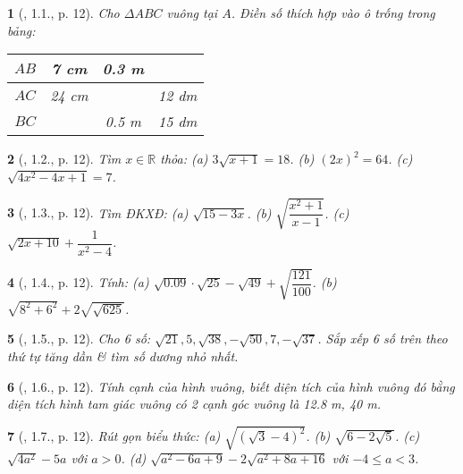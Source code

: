 \documentclass{article}
\newtheorem{baitoan}{}%
\begin{document}
\begin{baitoan}[\cite{Binh_boi_duong_Toan_9_tap_1}, 1.1., p. 12]
	Cho $\Delta ABC$ vuông tại $A$. Điền số thích hợp vào ô trống trong bảng:
	\begin{table}[H]
		\centering
		\begin{tabular}{|c|c|c|c|}
			\hline
			$AB$ & 7 cm & 0.3 m &  \\
			\hline
			$AC$ & 24 cm &  & 12 dm \\
			\hline
			$BC$ &  & 0.5 m & 15 dm \\
			\hline
		\end{tabular}
	\end{table}
\end{baitoan}

\begin{baitoan}[\cite{Binh_boi_duong_Toan_9_tap_1}, 1.2., p. 12]
	Tìm $x\in\mathbb{R}$ thỏa: (a) $3\sqrt{x + 1} = 18$. (b) $(2x)^2 = 64$. (c) $\sqrt{4x^2 - 4x + 1} = 7$.
\end{baitoan}

\begin{baitoan}[\cite{Binh_boi_duong_Toan_9_tap_1}, 1.3., p. 12]
	Tìm {\rm ĐKXĐ}: (a) $\sqrt{15 - 3x}$. (b) $\sqrt{\dfrac{x^2 + 1}{x - 1}}$. (c) $\sqrt{2x + 10} + \dfrac{1}{x^2 - 4}$.
\end{baitoan}

\begin{baitoan}[\cite{Binh_boi_duong_Toan_9_tap_1}, 1.4., p. 12]
	Tính: (a) $\sqrt{0.09}\cdot\sqrt{25} - \sqrt{49} + \sqrt{\dfrac{121}{100}}$. (b) $\sqrt{8^2 + 6^2} + 2\sqrt{\sqrt{625}}$.
\end{baitoan}

\begin{baitoan}[\cite{Binh_boi_duong_Toan_9_tap_1}, 1.5., p. 12]
	Cho 6 số: $\sqrt{21},5,\sqrt{38},-\sqrt{50},7,-\sqrt{37}$. Sắp xếp 6 số trên theo thứ tự tăng dần \& tìm số dương nhỏ nhất.
\end{baitoan}

\begin{baitoan}[\cite{Binh_boi_duong_Toan_9_tap_1}, 1.6., p. 12]
	Tính cạnh của hình vuông, biết diện tích của hình vuông đó bằng diện tích hình tam giác vuông có 2 cạnh góc vuông là {\rm12.8 m, 40 m}.
\end{baitoan}

\begin{baitoan}[\cite{Binh_boi_duong_Toan_9_tap_1}, 1.7., p. 12]
	Rút gọn biểu thức: (a) $\sqrt{(\sqrt{3} - 4)^2}$. (b) $\sqrt{6 - 2\sqrt{5}}$. (c) $\sqrt{4a^2} - 5a$ với $a > 0$. (d) $\sqrt{a^2 - 6a + 9} - 2\sqrt{a^2 + 8a + 16}$ với $-4\le a < 3$.
\end{baitoan}
\end{document}

